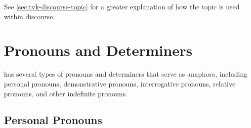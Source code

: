 See \autoref{sec:tvk-discourse-topic} for a greater explanation of how the topic is used within discourse.

\section{Pronouns and Determiners}
\label{sec:tvk-pronouns-determiners}
\langtvk{} has several types of pronouns and determiners that serve as anaphora, including personal pronouns, demonstrative pronouns, interrogative pronouns, relative pronouns, and other indefinite pronouns.

\subsection{Personal Pronouns}
\label{subsec:tvk-personal-pronouns}

